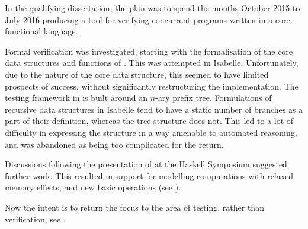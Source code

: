In the qualifying dissertation, the plan was to spend the months
October 2015 to July 2016 producing a tool for verifying concurrent
programs written in a core functional language.

Formal verification was investigated, starting with the formalisation
of the core data structures and functions of \dejafu{}. This was
attempted in Isabelle. Unfortunately, due to the nature of the core
data structure, this seemed to have limited prospects of success,
without significantly restructuring the implementation. The testing
framework in \dejafu{} is built around an $n$-ary prefix
tree. Formulations of recursive data structures in Isabelle tend to
have a static number of branches as a part of their definition,
whereas the \dejafu{} tree structure does not. This led to a lot of
difficulty in expressing the structure in a way amenable to automated
reasoning, and was abandoned as being too complicated for the return.

Discussions following the presentation of \dejafu{} at the Haskell
Symposium suggested further work. This resulted in support for
modelling computations with relaxed memory effects, and new basic
operations (see ).

Now the intent is to return the focus to the area of testing, rather
than verification, see .
